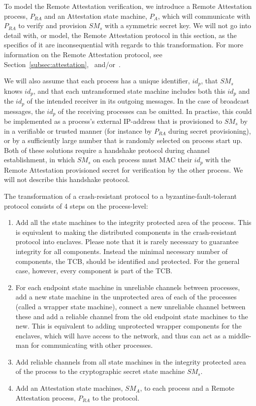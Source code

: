 \documentclass{article}
\begin{document}
	To model the Remote Attestation verification, we introduce a Remote Attestation process, $P_{RA}$ and an Attestation state machine, $P_A$, which will communicate with $P_{RA}$ to verify and provision $SM_s$ with a symmetric secret key.
	We will not go into detail with, or model, the Remote Attestation protocol in this section, as the specifics of it are inconsequential with regards to this transformation.
	For more information on the Remote Attestation protocol, see Section~\ref{subsec:attestation},~\cite{costan_intel_2016} and/or~\cite{intel_sgx_developer_reference}.

	We will also assume that each process has a unique identifier, $id_p$, that $SM_s$ knows $id_p$, and that each untransformed state machine includes both this $id_p$ and the $id_p$ of the intended receiver in its outgoing messages.
	In the case of broadcast messages, the $id_p$ of the receiving processes can be omitted.
	In practise, this could be implemented as a process's external IP-address that is provisioned to $SM_s$ by in a verifiable or trusted manner (for instance by $P_{RA}$ during secret provisioning), or by a sufficiently large number that is randomly selected on process start up.
	Both of these solutions require a handshake protocol during channel establishment, in which $SM_s$ on each process must MAC their $id_p$ with the Remote Attestation provisioned secret for verification by the other process.
	We will not describe this handshake protocol.

	The transformation of a crash-resistant protocol to a byzantine-fault-tolerant protocol consists of 4 steps on the process-level:
	\begin{enumerate}
		\item Add all the state machines to the integrity protected area of the process.
		This is equivalent to making the distributed components in the crash-resistant protocol into enclaves.
		Please note that it is rarely necessary to guarantee integrity for all components.
		Instead the minimal necessary number of components, the TCB, should be identified and protected.
		For the general case, however, every component is part of the TCB.
		\item For each endpoint state machine in unreliable channels between processes, add a new state machine in the unprotected area of each of the processes (called a wrapper state machine), connect a new unreliable channel between these and add a reliable channel from the old endpoint state machines to the new.
		This is equivalent to adding unprotected wrapper components for the enclaves, which will have access to the network, and thus can act as a middle-man for communicating with other processes.
		\item Add reliable channels from all state machines in the integrity protected area of the process to the cryptographic secret state machine $SM_s$.
		\item Add an Attestation state machines, $SM_A$, to each process and a Remote Attestation process, $P_{RA}$ to the protocol.
	\end{enumerate}
\end{document}
